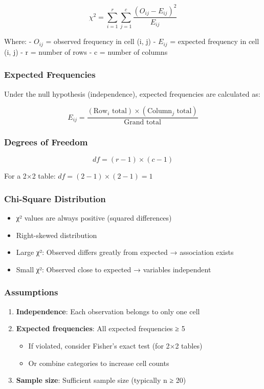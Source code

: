\documentclass[11pt]{article}
\providecommand{\tightlist}{%
      \setlength{\itemsep}{0pt}\setlength{\parskip}{0pt}}
\begin{document}
\[\chi^2 = \sum_{i=1}^{r} \sum_{j=1}^{c} \frac{(O_{ij} - E_{ij})^2}{E_{ij}}\]

Where: - \(O_{ij}\) = observed frequency in cell (i, j) - \(E_{ij}\) =
expected frequency in cell (i, j) - r = number of rows - c = number of
columns

\subsubsection{Expected Frequencies}\label{expected-frequencies}

Under the null hypothesis (independence), expected frequencies are
calculated as:

\[E_{ij} = \frac{(\text{Row}_i \text{ total}) \times (\text{Column}_j \text{ total})}{\text{Grand total}}\]

\subsubsection{Degrees of Freedom}\label{degrees-of-freedom}

\[df = (r - 1) \times (c - 1)\]

For a 2×2 table: \(df = (2-1) \times (2-1) = 1\)

\subsubsection{Chi-Square Distribution}\label{chi-square-distribution}

\begin{itemize}
\tightlist
\item
  χ² values are always positive (squared differences)
\item
  Right-skewed distribution
\item
  Large χ²: Observed differs greatly from expected → association exists
\item
  Small χ²: Observed close to expected → variables independent
\end{itemize}

\subsubsection{Assumptions}\label{assumptions}

\begin{enumerate}
\def\labelenumi{\arabic{enumi}.}
\tightlist
\item
  \textbf{Independence}: Each observation belongs to only one cell
\item
  \textbf{Expected frequencies}: All expected frequencies ≥ 5

  \begin{itemize}
  \tightlist
  \item
    If violated, consider Fisher's exact test (for 2×2 tables)
  \item
    Or combine categories to increase cell counts
  \end{itemize}
\item
  \textbf{Sample size}: Sufficient sample size (typically n ≥ 20)
\end{enumerate}
\end{document}
